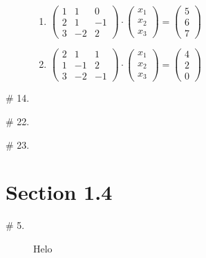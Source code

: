 \documentclass[8pt]{article} %
\begin{document}
\begin{description}
{\begin{enumerate}[label=(\alph*)]
		\item $\begin{pmatrix}1&1&0\\2&1&-1\\3&-2&2\end{pmatrix}\cdot\begin{pmatrix}x_1\\x_2\\x_3
			\end{pmatrix}=\begin{pmatrix}5\\6\\7\end{pmatrix}$
		\item $\begin{pmatrix}2&1&1\\1&-1&2\\3&-2&-1\end{pmatrix}\cdot\begin{pmatrix}x_1\\x_2\\x_3
			\end{pmatrix}=\begin{pmatrix}4\\2\\0\end{pmatrix}$
	\end{enumerate}
	}
\item[\# 14.]{{\it }
	}
\item[\# 22.]{{\it }
	}
\item[\# 23.]{{\it }
	}
\end{description}
\section{Section 1.4}
\begin{description}
\item[\# 5.]{Helo}
\end{description}
\end{document}
